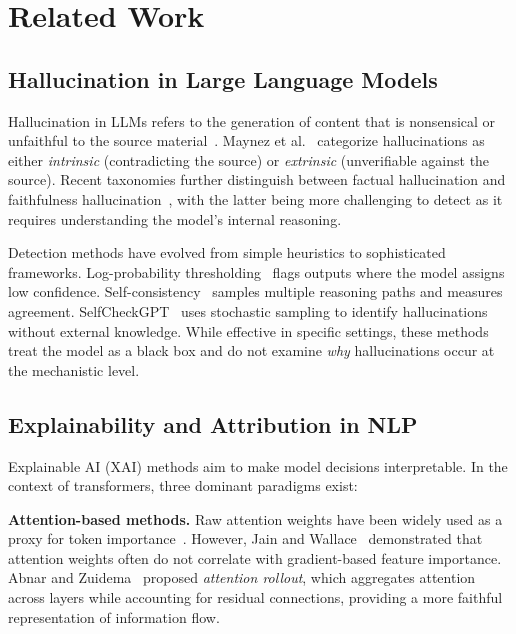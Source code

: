 \section{Related Work}
\label{sec:related}

\subsection{Hallucination in Large Language Models}

Hallucination in LLMs refers to the generation of content that is nonsensical or unfaithful to the source material~\cite{ji2023survey}. Maynez et al.~\cite{maynez2020faithfulness} categorize hallucinations as either \textit{intrinsic} (contradicting the source) or \textit{extrinsic} (unverifiable against the source). Recent taxonomies further distinguish between factual hallucination and faithfulness hallucination~\cite{zhang2023sirens}, with the latter being more challenging to detect as it requires understanding the model's internal reasoning.

Detection methods have evolved from simple heuristics to sophisticated frameworks. Log-probability thresholding~\cite{kadavath2022language} flags outputs where the model assigns low confidence. Self-consistency~\cite{wang2022self} samples multiple reasoning paths and measures agreement. SelfCheckGPT~\cite{manakul2023selfcheckgpt} uses stochastic sampling to identify hallucinations without external knowledge. While effective in specific settings, these methods treat the model as a black box and do not examine \textit{why} hallucinations occur at the mechanistic level.

\subsection{Explainability and Attribution in NLP}

Explainable AI (XAI) methods aim to make model decisions interpretable. In the context of transformers, three dominant paradigms exist:

\textbf{Attention-based methods.} Raw attention weights have been widely used as a proxy for token importance~\cite{vaswani2017attention}. However, Jain and Wallace~\cite{jain2019attention} demonstrated that attention weights often do not correlate with gradient-based feature importance. Abnar and Zuidema~\cite{abnar2020quantifying} proposed \textit{attention rollout}, which aggregates attention across layers while accounting for residual connections, providing a more faithful representation of information flow.

